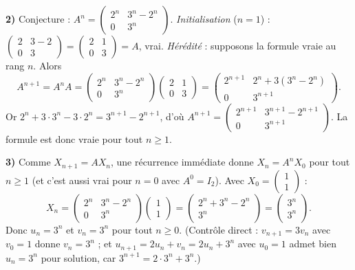 \textbf{2)} Conjecture : $A^n=\begin{pmatrix}2^n&3^n-2^n\\0&3^n\end{pmatrix}$.
\emph{Initialisation} ($n=1$) : $\begin{pmatrix}2&3-2\\0&3\end{pmatrix}=\begin{pmatrix}2&1\\0&3\end{pmatrix}=A$, vrai.
\emph{Hérédité} : supposons la formule vraie au rang $n$. Alors
\[
A^{n+1}=A^nA=\begin{pmatrix}2^n&3^n-2^n\\0&3^n\end{pmatrix}\begin{pmatrix}2&1\\0&3\end{pmatrix}
=\begin{pmatrix}2^{n+1}&2^n+3(3^n-2^n)\\0&3^{n+1}\end{pmatrix}.
\]
Or $2^n+3\cdot3^n-3\cdot2^n=3^{n+1}-2^{n+1}$, d'où
$A^{n+1}=\begin{pmatrix}2^{n+1}&3^{n+1}-2^{n+1}\\0&3^{n+1}\end{pmatrix}$. La formule est donc vraie pour tout $n\ge1$.

\textbf{3)} Comme $X_{n+1}=AX_n$, une récurrence immédiate donne $X_n=A^nX_0$ pour tout $n\ge1$
(et c'est aussi vrai pour $n=0$ avec $A^0=I_2$). Avec $X_0=\begin{pmatrix}1\\1\end{pmatrix}$ :
\[
X_n=\begin{pmatrix}2^n&3^n-2^n\\0&3^n\end{pmatrix}\begin{pmatrix}1\\1\end{pmatrix}
=\begin{pmatrix}2^n+3^n-2^n\\3^n\end{pmatrix}=\begin{pmatrix}3^n\\3^n\end{pmatrix}.
\]
Donc $u_n=3^n$ et $v_n=3^n$ pour tout $n\ge0$.
(Contrôle direct : $v_{n+1}=3v_n$ avec $v_0=1$ donne $v_n=3^n$ ; et $u_{n+1}=2u_n+v_n=2u_n+3^n$
avec $u_0=1$ admet bien $u_n=3^n$ pour solution, car $3^{n+1}=2\cdot3^n+3^n$.)

